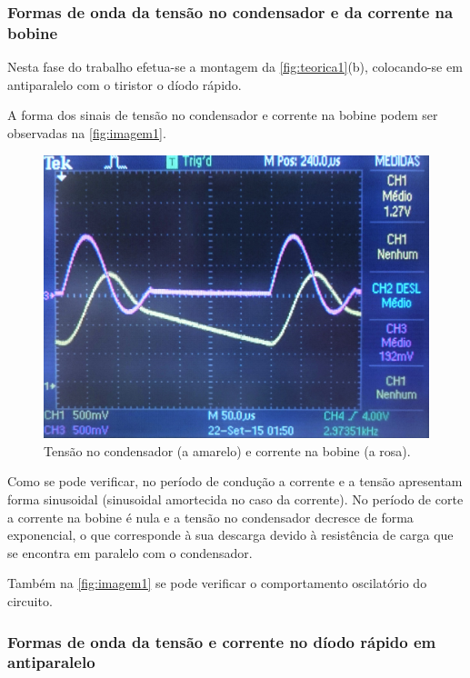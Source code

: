\documentclass[a4paper,11pt]{article}
\numberwithin{equation}{section}
\begin{document}
\subsubsection{Formas de onda da tensão no condensador e da corrente na bobine}

Nesta fase do trabalho efetua-se a montagem da \autoref{fig:teorica1}(b), colocando-se em antiparalelo com o tiristor o díodo rápido. 

A forma dos sinais de tensão no condensador e corrente na bobine podem ser observadas na \autoref{fig:imagem1}.

\begin{figure}[h]
	\centering
	\includegraphics[keepaspectratio=true, scale=0.17]{img/imagem1}
	\caption{Tensão no condensador (a amarelo) e corrente na bobine (a rosa).}
	\label{fig:imagem1}
	\vspace{-0.8em}
\end{figure}

Como se pode verificar, no período de condução a corrente e a tensão apresentam forma sinusoidal (sinusoidal amortecida no caso da corrente). No período de corte a corrente na bobine é nula e a tensão no condensador decresce de forma exponencial, o que corresponde à sua descarga devido à resistência de carga que se encontra em paralelo com o condensador.

Também na \autoref{fig:imagem1} se pode verificar o comportamento oscilatório do circuito.

\subsubsection{Formas de onda da tensão e corrente no díodo rápido em antiparalelo}
\end{document}
